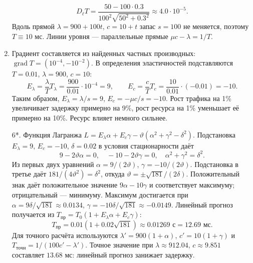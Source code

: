 \documentclass[12pt,a4paper]{article}
\begin{document}
\begin{enumerate}
\[
D_\ell T=\frac{50-100\cdot0.3}{100^2\sqrt{50^2+0.3^2}}
\approx4.0\cdot10^{-5}.
\]
Вдоль прямой $\lambda=900+100t$, $c=10+t$ запас $s=100$ не меняется,
поэтому $T\equiv10$ мс. Линии уровня --- параллельные прямые $\mu c-\lambda=1/T$.
\item Градиент составляется из найденных частных производных:
$\operatorname{grad}T=(10^{-4},-10^{-2})$.
В определения эластичностей подставляются $T=0.01$, $\lambda=900$, $c=10$:
\[
E_\lambda=\frac{\lambda}{T}T_\lambda
=\frac{900}{0.01}\cdot10^{-4}=9,\qquad
E_c=\frac{c}{T}T_c=\frac{10}{0.01}\cdot(-0.01)=-10.
\]
Таким образом, $E_\lambda=\lambda/s=9$,
$E_c=-\mu c/s=-10$. Рост трафика на 1\% увеличивает задержку примерно на 9\%,
рост ресурса на 1\% уменьшает её примерно на 10\%. Ресурс влияет немного сильнее.
\item[6*.] Функция Лагранжа
$L=E_\lambda\alpha+E_c\gamma-\vartheta(\alpha^2+\gamma^2-\delta^2)$.
Подстановка $E_\lambda=9$, $E_c=-10$, $\delta=0.02$ в условия
стационарности даёт
\[
9-2\vartheta\alpha=0,\quad -10-2\vartheta\gamma=0,\quad
\alpha^2+\gamma^2=\delta^2.
\]
Из первых двух уравнений $\alpha=9/(2\vartheta)$,
$\gamma=-10/(2\vartheta)$. Подстановка в третье даёт
$181/(4\vartheta^2)=\delta^2$, откуда
$\vartheta=\pm\sqrt{181}/(2\delta)$.
Положительный знак даёт положительное значение $9\alpha-10\gamma$
и соответствует максимуму; отрицательный --- минимуму.
Максимум достигается при $\alpha=9\delta/\sqrt{181}\approx0.0134$,
$\gamma=-10\delta/\sqrt{181}\approx-0.0149$.
Линейный прогноз получается из $T_{\mathrm{пр}}=T_0(1+E_\lambda\alpha+E_c\gamma)$:
\[
T_{\mathrm{пр}}=0.01(1+0.02\sqrt{181})\approx0.01269\text{ с}=12.69\text{ мс}.
\]
Для точного расчёта используются $\lambda'=900(1+\alpha)$,
$c'=10(1+\gamma)$ и $T_{\mathrm{точн}}=1/(100c'-\lambda')$.
Точное значение при $\lambda\approx912.04$, $c\approx9.851$ составляет
$13.68$ мс: линейный прогноз занижает задержку.
\end{enumerate}


\newpage
\end{document}
